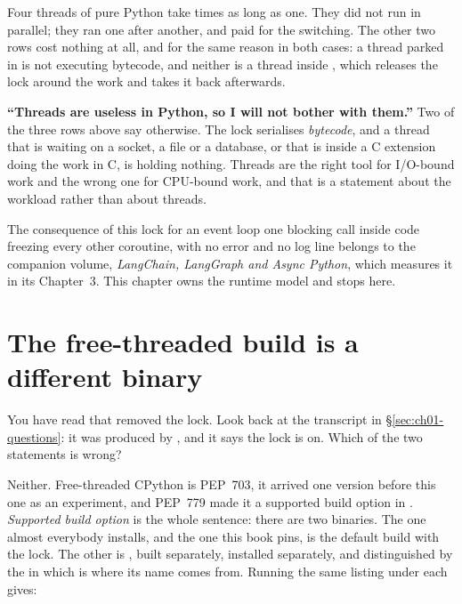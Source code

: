 \noindent
Four threads of pure Python take  times as long
as one. They did not run in parallel; they ran one after another, and paid
for the switching. The other two rows cost nothing at all, and for the same
reason in both cases: a thread parked in  is not executing
bytecode, and neither is a thread inside , which releases the
lock around the work and takes it back afterwards.


\begin{trapbox}
\textbf{\enquote{Threads are useless in Python, so I will not bother with
them.}} Two of the three rows above say otherwise. The lock serialises
\emph{bytecode}, and a thread that is waiting on a socket, a file or a
database, or that is inside a C extension doing the work in C, is holding
nothing. Threads are the right tool for I/O-bound work and the wrong one for
CPU-bound work, and that is a statement about the workload rather than about
threads.
\end{trapbox}

\begin{note}
The consequence of this lock for an event loop \dash{} one blocking call
inside  code freezing every other coroutine, with no error and
no log line \dash{} belongs to the companion volume, \emph{LangChain,
LangGraph and Async Python}, which measures it in its Chapter~3. This
chapter owns the runtime model and stops here.
\end{note}

\section{The free-threaded build is a different binary}
\label{sec:ch01-freethreaded}

\noindent
You have read that \pyver{} removed the lock. Look back at the transcript in
\S\ref{sec:ch01-questions}: it was produced by \pypatch, and it says the
lock is on. Which of the two statements is wrong?

\medskip
\noindent
Neither. Free-threaded CPython is PEP~703, it arrived one version before
this one as an experiment, and PEP~779 made it a supported build option in
\pyver{}. \emph{Supported build option} is the whole sentence: there are two
binaries. The one almost everybody
installs, and the one this book pins, is the default build with the lock.
The other is , built separately, installed separately, and
distinguished by the  in  \dash{} which is where
its name comes from. Running the same listing under each gives:

